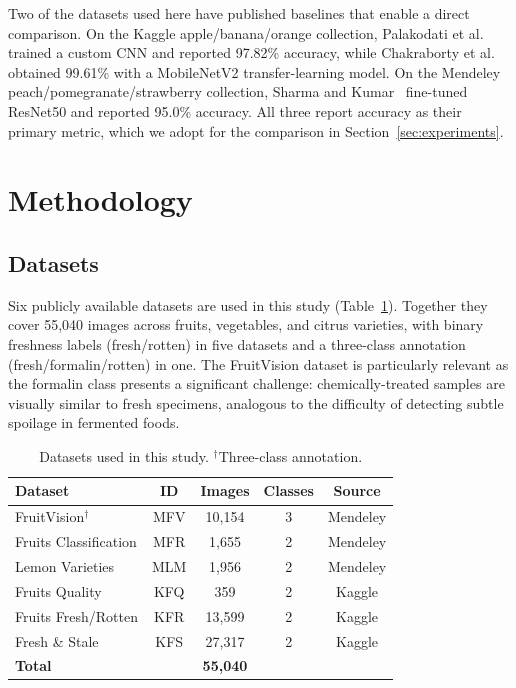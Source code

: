 \documentclass[conference]{IEEEtran}
\begin{document}
Two of the datasets used here have published baselines that enable a
direct comparison.
On the Kaggle apple/banana/orange collection,
Palakodati et al.~\cite{palakodati2020fresh} trained a custom CNN and
reported 97.82\% accuracy, while
Chakraborty et al.~\cite{chakraborty2021implementation} obtained 99.61\%
with a MobileNetV2 transfer-learning model.
On the Mendeley peach/pomegranate/strawberry collection,
Sharma and Kumar~\cite{sharma2025automated} fine-tuned ResNet50 and
reported 95.0\% accuracy.
All three report accuracy as their primary metric, which we adopt for the
comparison in Section~\ref{sec:experiments}.

\section{Methodology}
\label{sec:method}

\subsection{Datasets}

Six publicly available datasets are used in this study
(Table~\ref{tab:datasets}).
Together they cover 55,040 images across fruits, vegetables, and citrus
varieties, with binary freshness labels (fresh/rotten) in five datasets
and a three-class annotation (fresh/formalin/rotten) in one.
The FruitVision dataset is particularly relevant as the formalin class
presents a significant challenge: chemically-treated samples are
visually similar to fresh specimens, analogous to the difficulty of
detecting subtle spoilage in fermented foods.

\begin{table}[h]
\centering
\caption{Datasets used in this study. $^\dagger$Three-class annotation.}
\label{tab:datasets}
\setlength{\tabcolsep}{4pt}
\begin{tabular}{lcccc}
\toprule
\textbf{Dataset} & \textbf{ID} & \textbf{Images} & \textbf{Classes} & \textbf{Source} \\
\midrule
FruitVision$^\dagger$   & MFV & 10,154 & 3 & Mendeley \\
Fruits Classification   & MFR &  1,655 & 2 & Mendeley \\
Lemon Varieties         & MLM &  1,956 & 2 & Mendeley \\
Fruits Quality          & KFQ &    359 & 2 & Kaggle   \\
Fruits Fresh/Rotten     & KFR & 13,599 & 2 & Kaggle   \\
Fresh \& Stale          & KFS & 27,317 & 2 & Kaggle   \\
\midrule
\textbf{Total}          &     & \textbf{55,040} & & \\
\bottomrule
\end{tabular}
\end{table}
\end{document}
